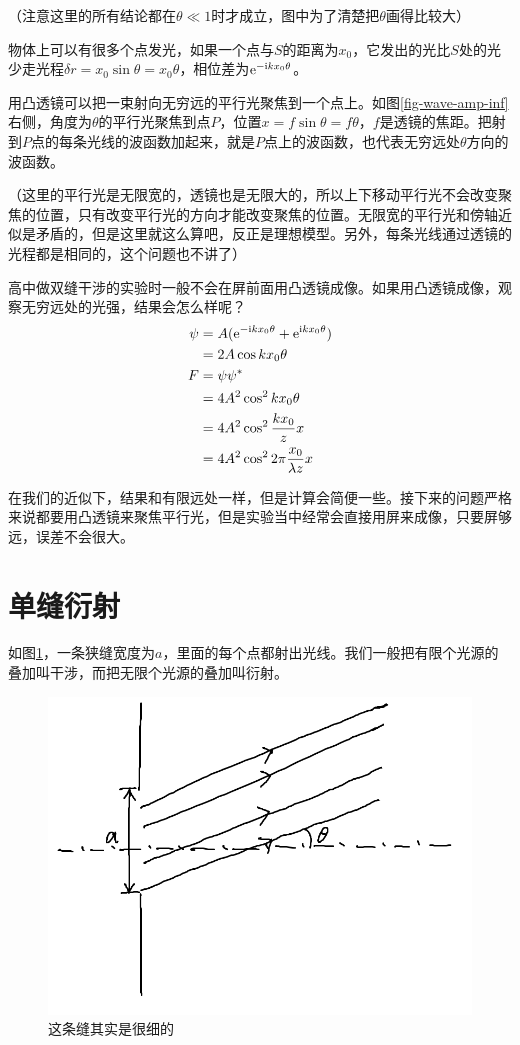 （注意这里的所有结论都在$\theta \ll 1$时才成立，图中为了清楚把$\theta$画得比较大）

物体上可以有很多个点发光，如果一个点与$S$的距离为$x_0$，它发出的光比$S$处的光少走光程$\delta r=x_0 \sin \theta=x_0 \theta$，相位差为$\mathrm{e}^{-\mathrm{i} k x_0 \theta}$。

用凸透镜可以把一束射向无穷远的平行光聚焦到一个点上。如图\ref{fig-wave-amp-inf}右侧，角度为$\theta$的平行光聚焦到点$P$，位置$x=f \sin \theta=f \theta$，$f$是透镜的焦距。把射到$P$点的每条光线的波函数加起来，就是$P$点上的波函数，也代表无穷远处$\theta$方向的波函数。

（这里的平行光是无限宽的，透镜也是无限大的，所以上下移动平行光不会改变聚焦的位置，只有改变平行光的方向才能改变聚焦的位置。无限宽的平行光和傍轴近似是矛盾的，但是这里就这么算吧，反正是理想模型。另外，每条光线通过透镜的光程都是相同的，这个问题也不讲了）

高中做双缝干涉的实验时一般不会在屏前面用凸透镜成像。如果用凸透镜成像，观察无穷远处的光强，结果会怎么样呢？
\begin{align*}
\psi&=A(\mathrm{e}^{-\mathrm{i} k x_0 \theta}+\mathrm{e}^{\mathrm{i} k x_0 \theta}) \\
&=2 A \cos k x_0 \theta \\
F&=\psi \psi^* \\
&=4 A^2 \cos^2 k x_0 \theta \\
&=4 A^2 \cos^2 \frac{k x_0}{z} x \\
&=4 A^2 \cos^2 2 \pi \frac{x_0}{\lambda z} x
\end{align*}

在我们的近似下，结果和有限远处一样，但是计算会简便一些。接下来的问题严格来说都要用凸透镜来聚焦平行光，但是实验当中经常会直接用屏来成像，只要屏够远，误差不会很大。
\section{单缝衍射}
如图\ref{fig-silt-diff}，一条狭缝宽度为$a$，里面的每个点都射出光线。我们一般把有限个光源的叠加叫干涉，而把无限个光源的叠加叫衍射。
\begin{figure}[htb]
\centering
\includegraphics[scale=0.5]{fig/silt-diff.png}
\caption{这条缝其实是很细的}
\label{fig-silt-diff}
\end{figure}

